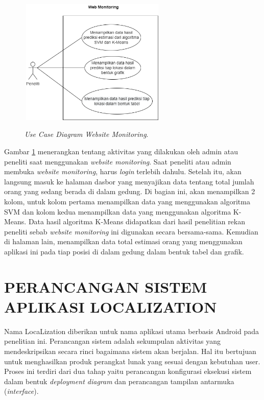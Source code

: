 \begin{figure}[H]
	\center
	\shadowbox
	{\includegraphics [width=7cm, height=6cm]{gambar/usecasediagrampeneliti.drawio.png}}
	\caption{\textit{Use Case Diagram Website Monitoring}.}
	\label{usecasewebmonitoring}
\end{figure}

Gambar \ref{usecasewebmonitoring} menerangkan tentang aktivitas yang dilakukan oleh admin atau peneliti saat  menggunakan \textit{website monitoring}. Saat peneliti atau admin membuka \textit{website monitoring}, harus \textit{login} terlebih dahulu. Setelah itu, akan langsung masuk ke halaman dasbor yang menyajikan data tentang total jumlah orang yang sedang berada di dalam gedung. Di bagian ini, akan menampilkan 2 kolom, untuk kolom pertama menampilkan data yang menggunakan algoritma SVM dan kolom kedua menampilkan data yang menggunakan algoritma K-Means. Data hasil algoritma K-Means didapatkan dari hasil penelitian rekan peneliti sebab \textit{website monitoring} ini digunakan secara bersama-sama. Kemudian di halaman lain, menampilkan data total estimasi orang yang menggunakan aplikasi ini pada tiap posisi di dalam gedung dalam bentuk tabel dan grafik.


\section{PERANCANGAN SISTEM APLIKASI LOCALIZATION}


\par Nama LocaLization diberikan untuk nama aplikasi utama berbasis Android pada penelitian ini. Perancangan sistem adalah sekumpulan aktivitas yang mendeskripsikan secara rinci bagaimana sistem akan berjalan. Hal itu bertujuan untuk menghasilkan produk perangkat lunak yang sesuai dengan kebutuhan user. Proses ini terdiri dari dua tahap yaitu perancangan konfigurasi eksekusi sistem dalam bentuk \textit{deployment diagram} dan perancangan tampilan antarmuka (\textit{interface}).

